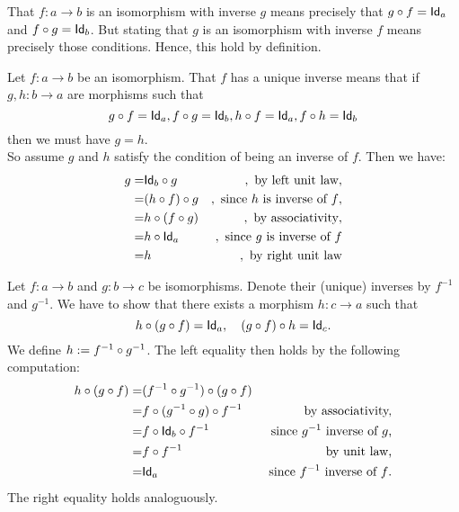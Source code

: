 \begin{solution}\label{sol:inverse-iso}
That $f:a\to b$ is an isomorphism with inverse $g$ means precisely that $\co{f}{g} = \Id[a]$ and $\co{g}{f} = \Id[b]$. But stating that $g$ is an isomorphism with inverse $f$ means precisely those conditions. Hence, this hold by definition.
\end{solution}

\begin{solution}\label{sol:inverse_uniqueness}
Let $f:a\to b$ be an isomorphism. That $f$ has a unique inverse means that if $g,h : b\to a$ are morphisms such that 
\[
\co{f}{g} = \Id[a], \co{g}{f} = \Id[b], \co{f}{h} = \Id[a], \co{h}{f} = \Id[b]
\]
then we must have $g = h$.\\
So assume $g$ and $h$ satisfy the condition of being an inverse of $f$. Then we have:
\begin{eqnarray*}
g =& \co{g}{\Id[b]} &,\text{ by left unit law},\\
	=& \co{g}{(\co{f}{h})} &, \text{ since $h$ is inverse of $f$},\\
	=& \co{(\co{g}{f})}{h} &, \text{ by associativity},\\
	=& \co{\Id[a]}{h} &, \text{ since $g$ is inverse of $f$}\\
	=& h &, \text{ by right unit law}
\end{eqnarray*}
\end{solution}

\begin{solution}\label{sol:compofiso}
Let $f: a\to b$ and $g:b\to c$ be isomorphisms. Denote their (unique) inverses by $f^{-1}$ and $g^{-1}$. We have to show that there exists a morphism $h : c\to a$ such that 
\[
\co{(\co{f}{g})}{h} = \Id[a], \quad \co{h}{(\co{f}{g})} = \Id[c].
\]
We define $h := \co{g^{-1}}{f^{-1}}$. The left equality then holds by the following computation:
\begin{eqnarray*}
\co{(\co{f}{g})}{h} =& \co{(\co{f}{g})}{(\co{g^{-1}}{f^{-1}})} &\\
	=& \co{f^{-1}}{\co{(\co{g}{g^{-1}})}{f}} &\text{ by associativity,}\\
	=& \co{f^{-1}}{\co{\Id[b]}{f}} &\text{ since $g^{-1}$ inverse of $g$,}\\
	=& \co{f^{-1}}{f} &\text{ by unit law,}\\
	=& \Id[a] &\text{ since $f^{-1}$ inverse of $f$.}
\end{eqnarray*}
The right equality holds analoguously.
\end{solution}


